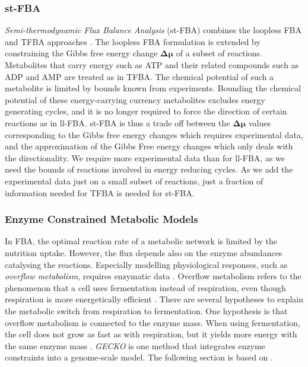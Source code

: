 \subsubsection{st-FBA}
\textit{Semi-thermodynamic Flux Balance Analysis} (st-FBA) combines the loopless FBA and TFBA approaches \cite{noor_removing_2018}. The loopless FBA formulation is extended by constraining the Gibbs free energy change $\boldsymbol{\Delta \mu}$ of a subset of reactions. Metabolites that carry energy such as ATP and their related compounds such as ADP and AMP are treated as in TFBA. The chemical potential of such a metabolite is limited by bounds known from experiments. Bounding the chemical potential of these energy-carrying currency metabolites excludes energy generating cycles, and it is no longer required to force the direction of certain reactions as in ll-FBA. 
st-FBA is thus a trade off between the $\boldsymbol{\Delta \mu}$ values corresponding to the Gibbs free energy changes which requires experimental data, and the approximation of the Gibbs Free energy changes which only deals with the directionality.
We require more experimental data than for ll-FBA, as we need the bounds of reactions involved in energy reducing cycles. As we add the experimental data just on a small subset of reactions, just a fraction of information needed for TFBA is needed for st-FBA.

\subsubsection{Enzyme Constrained Metabolic Models}
In FBA, the optimal reaction rate of a metabolic network is limited by the nutrition uptake. However, the flux depends also on the enzyme abundances catalysing the reactions. Especially modelling physiological responses, such as \textit{overflow metabolism}, requires enzymatic data \cite{improving_phenotype_predictions}. Overflow metabolism refers to the phenomenon that a cell uses fermentation instead of respiration, even though respiration is more energetically efficient \cite{overflow}. There are several hypotheses to explain the metabolic switch from respiration to fermentation. One hypothesis is that overflow metabolism is connected to the enzyme mass. When using fermentation, the cell does not grow as fast as with respiration, but it yields more energy with the same enzyme mass \cite{improving_phenotype_predictions}.  
\textit{GECKO} is one method that integrates enzyme constraints into a genome-scale model. The following section is based on \cite{improving_phenotype_predictions}. 


